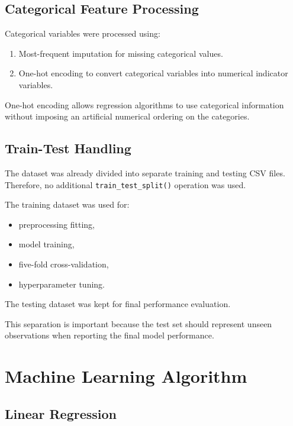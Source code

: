 \documentclass[12pt,a4paper]{article}
\begin{document}
\subsection{Categorical Feature Processing}

Categorical variables were processed using:

\begin{enumerate}
    \item Most-frequent imputation for missing categorical values.
    \item One-hot encoding to convert categorical variables into numerical indicator variables.
\end{enumerate}

One-hot encoding allows regression algorithms to use categorical information without imposing an artificial numerical ordering on the categories.

\subsection{Train-Test Handling}

The dataset was already divided into separate training and testing CSV files. Therefore, no additional \texttt{train\_test\_split()} operation was used.

The training dataset was used for:

\begin{itemize}
    \item preprocessing fitting,
    \item model training,
    \item five-fold cross-validation,
    \item hyperparameter tuning.
\end{itemize}

The testing dataset was kept for final performance evaluation.

This separation is important because the test set should represent unseen observations when reporting the final model performance.

\section{Machine Learning Algorithm}

\subsection{Linear Regression}
\end{document}
